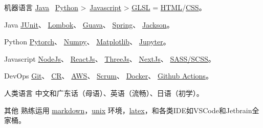 
\begin{cvskills}

  \cvskill
    {机器语言}
    {\href{https://www.java.com/en/}{Java} \approx \, \href{https://www.python.org/}{Python} >\, \href{https://www.javascript.com/}{Javascript} > \href{https://www.khronos.org/opengl/wiki/OpenGL_Shading_Language}{GLSL} = \href{https://developer.mozilla.org/en-US/docs/Glossary/HTML5}{HTML}/\href{https://developer.mozilla.org/en-US/docs/Web/CSS}{CSS}。}
  
  \cvskill
    {Java} %
    {\href{https://junit.org/junit4/}{JUnit}、 \href{https://projectlombok.org/}{Lombok}、 \href{https://github.com/google/guava}{Guava}、 \href{https://spring.io/}{Spring}、 \href{https://github.com/FasterXML/jackson}{Jackson}。}  %

  \cvskill
    {Python} %
    {\href{https://pytorch.org/}{Pytorch}、 \href{https://numpy.org/}{Numpy}、 \href{https://matplotlib.org/}{Matplotlib}、 \href{https://jupyter.org/}{Jupyter}。}  %

  \cvskill
    {Javascript} %
    {\href{https://nodejs.org/en/}{NodeJs}、 \href{https://reactjs.org/}{ReactJs}、 \href{https://threejs.org/}{ThreeJs}、 \href{https://nextjs.org/}{NextJs}、 \href{https://sass-lang.com/}{SASS/SCSS}。}
  
  \cvskill
    {DevOps} %
    {\href{https://git-scm.com/}{Git}、 \href{https://en.wikipedia.org/wiki/Code_review}{CR}、 \href{https://aws.amazon.com/}{AWS}、 \href{https://www.scrum.org/resources/what-is-scrum}{Scrum}、 \href{https://www.docker.com/}{Docker}、 \href{https://github.com/features/actions}{Github Actions}。}
 
  \cvskill
    {人类语言}
    {中文和广东话（母语）、英语（流畅）、日语（初学）。}

  \cvskill
    {其他} %
    {熟练运用 \href{https://en.wikipedia.org/wiki/Markdown}{markdown}，\href{https://en.wikipedia.org/wiki/Unix}{unix} 环境，\href{https://www.latex-project.org/}{latex}，和各类IDE如VSCode和Jetbrain全家桶。}

\end{cvskills}

